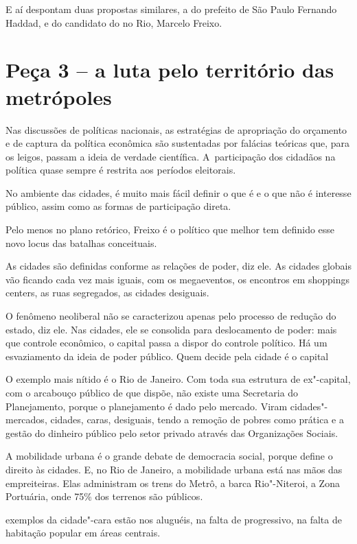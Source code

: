 E aí despontam duas propostas similares, a do prefeito de São Paulo
Fernando Haddad, e do candidato do  no Rio, Marcelo Freixo.

\section{Peça 3 -- a luta pelo território das metrópoles}

Nas discussões de políticas nacionais, as estratégias de apropriação do
orçamento e de captura da política econômica são sustentadas por
falácias teóricas que, para os leigos, passam a ideia de verdade
científica. A~participação dos cidadãos na política quase sempre é
restrita aos períodos eleitorais.

No ambiente das cidades, é muito mais fácil definir o que é e o que não
é interesse público, assim como as formas de participação direta.

Pelo menos no plano retórico, Freixo é o político que melhor tem
definido esse novo locus das batalhas conceituais.

As cidades são definidas conforme as relações de poder, diz ele. As
cidades globais vão ficando cada vez mais iguais, com os megaeventos, os
encontros em shoppings centers, as ruas segregados, as cidades
desiguais.

O fenômeno neoliberal não se caracterizou apenas pelo processo de
redução do estado, diz ele. Nas cidades, ele se consolida para
deslocamento de poder: mais que controle econômico, o capital passa a
dispor do controle político. Há um esvaziamento da ideia de poder
público. Quem decide pela cidade é o capital

O exemplo mais nítido é o Rio de Janeiro. Com toda sua estrutura de
ex"-capital, com o arcabouço público de que dispõe, não existe uma
Secretaria do Planejamento, porque o planejamento é dado pelo mercado.
Viram cidades"-mercados, cidades, caras, desiguais, tendo a remoção de
pobres como prática e a gestão do dinheiro público pelo setor privado
através das Organizações Sociais.

A mobilidade urbana é o grande debate de democracia social, porque
define o direito às cidades. E, no Rio de Janeiro, a mobilidade urbana
está nas mãos das empreiteiras. Elas administram os trens do Metrô, a
barca Rio"-Niteroi, a Zona Portuária, onde 75\% dos terrenos são
públicos.

 exemplos da cidade"-cara estão nos aluguéis, na falta de 
progressivo, na falta de habitação popular em áreas centrais.

